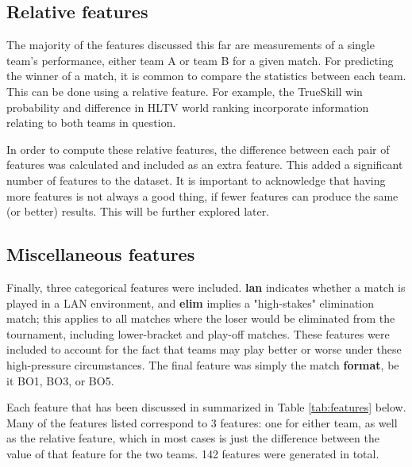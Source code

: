 \subsection{Relative features}

The majority of the features discussed this far are measurements of a single team's performance, either team A or team B for a given match. For predicting the winner of a match, it is common to compare the statistics between each team. This can be done using a relative feature. For example, the TrueSkill win probability and difference in HLTV world ranking incorporate information relating to both teams in question.

In order to compute these relative features, the difference between each pair of features was calculated and included as an extra feature. This added a significant number of features to the dataset. It is important to acknowledge that having more features is not always a good thing, if fewer features can produce the same (or better) results. This will be further explored later.

\subsection{Miscellaneous features}

Finally, three categorical features were included. \textbf{lan} indicates whether a match is played in a LAN environment, and \textbf{elim} implies a "high-stakes" elimination match; this applies to all matches where the loser would be eliminated from the tournament, including lower-bracket and play-off matches. These features were included to account for the fact that teams may play better or worse under these high-pressure circumstances. The final feature was simply the match \textbf{format}, be it BO1, BO3, or BO5.

Each feature that has been discussed in summarized in Table \ref{tab:features} below. Many of the features listed correspond to 3 features: one for either team, as well as the relative feature, which in most cases is just the difference between the value of that feature for the two teams. 142 features were generated in total.

